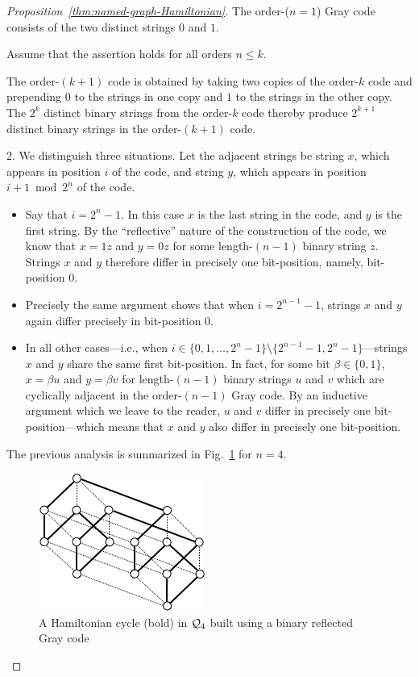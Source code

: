 \begin{proof}[Proposition~\ref{thm:named-graph-Hamiltonian}]
The order-($n=1$) Gray code consists of the two distinct strings $0$ and $1$.

\smallskip

Assume that the assertion holds for all orders $n \leq k$.

\smallskip

The order-$(k+1)$ code is obtained by taking two copies of the order-$k$ code and prepending $0$ to the strings in one copy and $1$ to the strings in the other copy.  The $2^k$ distinct binary strings from the order-$k$ code thereby produce $2^{k+1}$ distinct binary strings in the order-$(k+1)$ code.

\medskip

 2.
We distinguish three situations.  Let the adjacent strings be string $x$, which appears in position $i$ of the code, and string $y$, which appears in position $i+1 \bmod 2^n$ of the code.
  \begin{itemize}
  \item
Say that $i = 2^n-1$.  In this case $x$ is the last string in the code, and $y$ is the first string.  By the ``reflective'' nature of the construction of the code, we know that $x = 1z$ and $y = 0z$ for some length-$(n-1)$ binary string $z$.  Strings $x$ and $y$ therefore differ in precisely one bit-position, namely, bit-position $0$.

  \medskip\item
Precisely the same argument shows that when $i = 2^{n-1} -1$, strings $x$ and $y$ again differ precisely in bit-position $0$.

  \medskip\item
In all other cases---i.e., when $i \in \{0,1, \ldots, 2^n-1\} \setminus \{2^{n-1} -1, 2^n-1\}$---strings  $x$ and $y$ share the same first bit-position.  In fact, for some bit $\beta \in \{0,1\}$, $x = \beta u$ and $y = \beta v$ for length-$(n-1)$ binary strings $u$ and $v$ which are cyclically adjacent in the order-$(n-1)$ Gray code.  By an inductive argument which we leave to the reader, $u$ and $v$ differ in precisely one bit-position---which means that $x$ and $y$ also differ in precisely one bit-position.
  \end{itemize}
The previous analysis is summarized in Fig.~\ref{fig:HamiltonHypercude} for $n=4$.
  \begin{figure}[hbt]
\begin{center}
       \includegraphics[scale=0.5]{FiguresGraph/HamiltonHypercube}
       \caption{A Hamiltonian cycle (bold) in $\mbox{$\cal Q$}_4$ built using a binary reflected Gray code}
  \label{fig:HamiltonHypercude}
\end{center}
\end{figure}


\end{proof}
